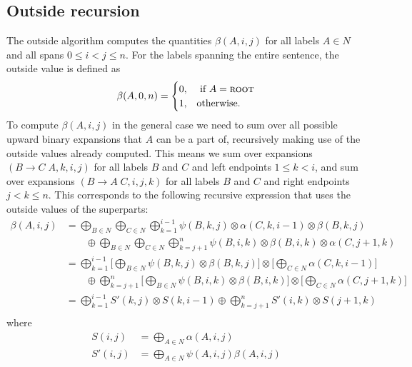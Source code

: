 \subsection{Outside recursion}
  The outside algorithm computes the quantities $\beta(A,i,j)$ for all labels $A \in N$ and all spans $0 \leq i < j \leq n$. For the labels spanning the entire sentence, the outside value is defined as
  \begin{align*}
    \beta(A, 0, n) =
    \begin{cases}
      0, & \text{ if } A = \textsc{root} \\
      1, & \text{otherwise}.
    \end{cases}
  \end{align*}
  To compute $\beta(A, i, j)$ in the general case we need to sum over all possible upward binary expansions that $A$ can be a part of, recursively making use of the outside values already computed. This means we sum over expansions $(B \to C \; A, k, i, j)$ for all labels $B$ and $C$ and left endpoints $1 \leq k < i$, and sum over expansions $(B \to A \; C, i, j, k)$ for all labels $B$ and $C$ and right endpoints $j < k \leq n$. This corresponds to the following recursive expression that uses the outside values of the superparts:
  \begin{align*}
    \beta(A, i, j)
      &= \bigoplus_{B \in N} \bigoplus_{C \in N} \bigoplus_{k=1}^{i-1} \psi(B, k, j) \otimes \alpha(C, k, i-1) \otimes \beta(B, k, j) \\
        &\qquad \oplus \bigoplus_{B \in N} \bigoplus_{C \in N} \bigoplus_{k=j+1}^{n} \psi(B, i, k) \otimes \beta(B, i, k) \otimes \alpha(C, j+1, k) \\
      &=  \bigoplus_{k=1}^{i-1}  \Bigg[ \bigoplus_{B \in N} \psi(B, k, j)  \otimes \beta(B, k, j) \Bigg] \otimes \Bigg[ \bigoplus_{C \in N} \alpha(C, k, i-1) \Bigg] \\
        &\qquad \oplus \bigoplus_{k=j+1}^{n}  \Bigg[ \bigoplus_{B \in N}  \psi(B, i, k) \otimes \beta(B, i, k) \Bigg] \otimes  \Bigg[  \bigoplus_{C \in N} \alpha(C, j+1, k) \Bigg] \\
      &=  \bigoplus_{k=1}^{i-1}  S'(k, j) \otimes S(k, i-1) \oplus \bigoplus_{k=j+1}^{n} S'(i, k) \otimes  S(j+1, k) \\
  \end{align*}
  where
  \begin{align*}
      S(i, j) &= \bigoplus_{A \in N} \alpha(A, i, j) \\
      S'(i, j) &= \bigoplus_{A \in N} \psi(A, i, j) \beta(A, i, j)
  \end{align*}

